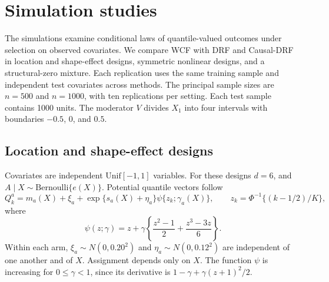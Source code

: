 \section{Simulation studies}\label{sec:simulations}

The simulations examine conditional laws of quantile-valued outcomes under selection on observed covariates. We compare WCF with DRF and Causal-DRF in location and shape-effect designs, symmetric nonlinear designs, and a structural-zero mixture. Each replication uses the same training sample and independent test covariates across methods. The principal sample sizes are $n=500$ and $n=1000$, with ten replications per setting. Each test sample contains 1000 units. The moderator $V$ divides $X_1$ into four intervals with boundaries $-0.5$, $0$, and $0.5$.

\subsection{Location and shape-effect designs}\label{sec:income-design}

Covariates are independent $\mathrm{Unif}[-1,1]$ variables. For these designs $d=6$, and $A\mid X\sim\mathrm{Bernoulli}\{e(X)\}$. Potential quantile vectors follow
\begin{equation}\label{eq:dgp}
 Q_k^a=m_a(X)+\xi_a+\exp\{s_a(X)+\eta_a\}\psi\{z_k;\gamma_a(X)\},
 \qquad z_k=\Phi^{-1}\{(k-1/2)/K\},
\end{equation}
where
\[
 \psi(z;\gamma)=z+\gamma\left\{\frac{z^2-1}{2}+\frac{z^3-3z}{6}\right\}.
\]
Within each arm, $\xi_a\sim N(0,0.20^2)$ and $\eta_a\sim N(0,0.12^2)$ are independent of one another and of $X$. Assignment depends only on $X$. The function $\psi$ is increasing for $0\leq\gamma<1$, since its derivative is $1-\gamma+\gamma(z+1)^2/2$.

